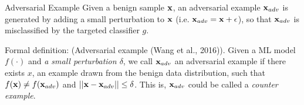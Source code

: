 \documentclass[xcolor=pdftex,dvipsnames,table,mathserif]{beamer}
\begin{document}
\begin{frame}{Adversarial Example}
Given a benign sample $\mathbf{x}$, an adversarial example $\mathbf{x}_{adv}$ is generated by adding a small perturbation to $\mathbf{x}$ (i.e. $\mathbf{x}_{adv}=\mathbf{x}+\epsilon$), so that $\mathbf{x}_{adv}$ is misclassified by the targeted classifier $g$.

Formal definition:
(Adversarial example (Wang et al., 2016)). Given a ML model $f(\cdot)$ and \emph{a small perturbation $\delta$}, we call $\mathbf{x}_{adv}$ an adversarial example 
if there exists $x$, an example drawn from the benign data distribution, such that $f(\mathbf{x})\neq f(\mathbf{x}_{adv})$ and $||\mathbf{x} - \mathbf{x}_{adv}|| \leq \delta$.
This is, $\mathbf{x}_{adv}$ could be called a \emph{counter example}.
\end{frame}
\end{document}
